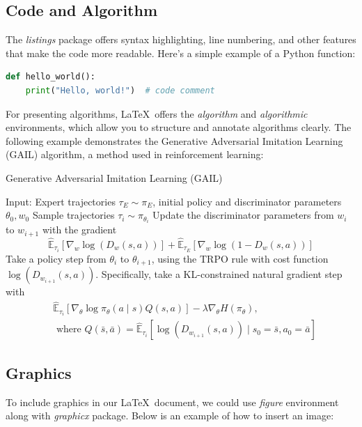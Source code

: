 \subsection*{Code and Algorithm}
The \textit{listings} package offers syntax highlighting, line numbering, and other features that make the code more readable. Here’s a simple example of a Python function:

\begin{lstlisting}[language=Python]
def hello_world():
    print("Hello, world!")  # code comment
\end{lstlisting}

For presenting algorithms, \LaTeX\ offers the \textit{algorithm} and \textit{algorithmic} environments, which allow you to structure and annotate algorithms clearly. The following example demonstrates the Generative Adversarial Imitation Learning (GAIL) algorithm, a method used in reinforcement learning:

\begin{algorithm}
    \caption{Generative Adversarial Imitation Learning (GAIL)}
    \label{alg1}
    \begin{algorithmic}[1]
    \State Input: Expert trajectories $\tau_E \sim \pi_E$, initial policy and discriminator parameters $\theta_0, w_0$
        \State Sample trajectories $\tau_i \sim \pi_{\theta_i}$
        \State Update the discriminator parameters from $w_i$ to $w_{i+1}$ with the gradient
        $$
            \hat{\mathbb{E}}_{\tau_i}\left[\nabla_w \log \left(D_w(s, a)\right)\right]+\hat{\mathbb{E}}_{\tau_E}\left[\nabla_w \log \left(1-D_w(s, a)\right)\right]
        $$
        \State Take a policy step from $\theta_i$ to $\theta_{i+1}$, using the TRPO rule with cost function $\log \left(D_{w_{i+1}}(s, a)\right)$. Specifically, take a KL-constrained natural gradient step with
        \begin{align*}
            & \hat{\mathbb{E}}_{\tau_i}\left[\nabla_\theta \log \pi_\theta(a \mid s) Q(s, a)\right]-\lambda \nabla_\theta H\left(\pi_\theta\right), \\
            & \text { where } Q(\bar{s}, \bar{a})=\hat{\mathbb{E}}_{\tau_i}\left[\log \left(D_{w_{i+1}}(s, a)\right) \mid s_0=\bar{s}, a_0=\bar{a}\right]
        \end{align*}
    \EndFor
    \end{algorithmic}
\end{algorithm}


\subsection*{Graphics}
To include graphics in our \LaTeX\ document, we could use \textit{figure} environment along with \textit{graphicx} package. Below is an example of how to insert an image:

